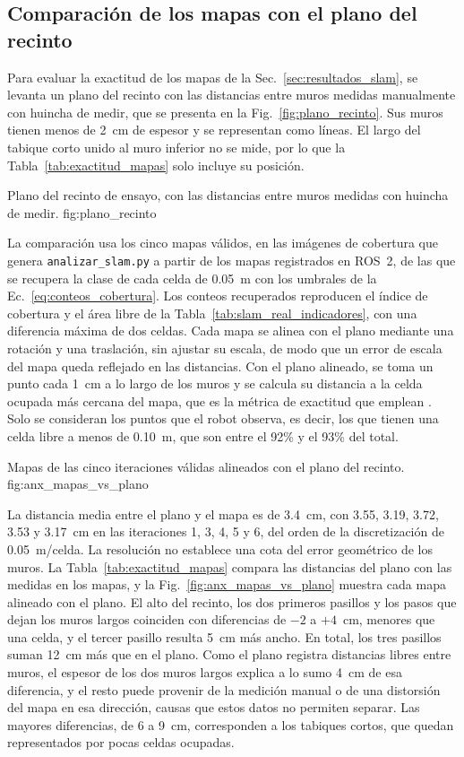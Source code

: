 \begin{appendices}
\subsection{Comparación de los mapas con el plano del recinto}
\label{anx:comparacion_plano}

Para evaluar la exactitud de los mapas de la Sec.~\ref{sec:resultados_slam}, se
levanta un plano del recinto con las distancias entre muros medidas
manualmente con huincha de medir, que se presenta en la
Fig.~\ref{fig:plano_recinto}. Sus muros
tienen menos de 2~cm de espesor y se representan como líneas. El largo del
tabique corto unido al muro inferior no se mide, por lo que la
Tabla~\ref{tab:exactitud_mapas} solo incluye su posición.

{Plano del recinto de ensayo, con las distancias entre muros medidas con huincha de medir.}
{fig:plano_recinto}

La comparación usa los cinco mapas válidos, en las imágenes de cobertura que
genera \texttt{analizar\_slam.py} a partir de los mapas registrados en ROS~2,
de las que se recupera la clase de cada celda de 0.05~m con los umbrales de la
Ec.~\eqref{eq:conteos_cobertura}. Los conteos recuperados reproducen el índice
de cobertura y el área libre de la Tabla~\ref{tab:slam_real_indicadores}, con
una diferencia máxima de dos celdas. Cada mapa se alinea con el plano mediante
una rotación y una traslación, sin ajustar su escala, de modo que un error de
escala del mapa queda reflejado en las distancias. Con el plano alineado, se
toma un punto cada 1~cm a lo largo de los muros y se calcula su distancia a la
celda ocupada más cercana del mapa, que es la métrica de exactitud que emplean
\citet{trejos2022slam}. Solo se consideran los puntos que el robot observa, es
decir, los que tienen una celda libre a menos de 0.10~m, que son entre el 92\% y
el 93\% del total.

{Mapas de las cinco iteraciones válidas alineados con el plano del recinto.}
{fig:anx_mapas_vs_plano}

La distancia media entre el plano y el mapa es de 3.4~cm, con 3.55, 3.19, 3.72,
3.53 y 3.17~cm en las iteraciones 1, 3, 4, 5 y 6, del orden de la
discretización de 0.05~m/celda. La resolución no establece una cota del error
geométrico de los muros. La Tabla~\ref{tab:exactitud_mapas} compara las distancias
del plano con las medidas en los mapas, y la Fig.~\ref{fig:anx_mapas_vs_plano}
muestra cada mapa alineado con el plano. El alto del recinto, los dos primeros
pasillos y los pasos que dejan los muros largos coinciden con diferencias de
$-2$ a $+4$~cm, menores que una celda, y el tercer pasillo resulta 5~cm más
ancho. En total, los tres pasillos suman 12~cm más que en el plano. Como el
plano registra distancias libres entre muros, el espesor de los dos muros
largos explica a lo sumo 4~cm de esa diferencia, y el resto puede provenir de la
medición manual o de una distorsión del mapa en esa dirección, causas que estos
datos no permiten separar. Las mayores diferencias, de 6 a 9~cm, corresponden a
los tabiques cortos, que quedan representados por pocas celdas ocupadas.


\end{appendices}
